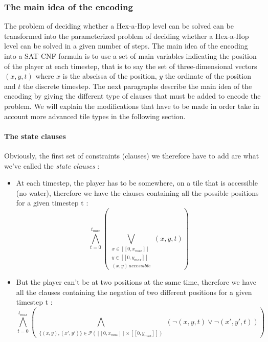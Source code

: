 \documentclass[a4paper, 12pt, titlepage]{article}
\begin{document}
\subsubsection{The main idea of the encoding}
The problem of deciding whether a Hex-a-Hop level can be solved can be
transformed into the parameterized problem of deciding whether a Hex-a-Hop level
can be solved in a given number of steps.
The main idea of the encoding into a SAT CNF formula is to use a set of main
variables indicating the position of the player at each timestep, that is to say
the set of three-dimensional vectors $(x, y, t)$ where $x$ is the abscissa of
the position, $y$ the ordinate of the position and $t$ the discrete timestep.
The next paragraphs describe the main idea of the encoding by giving the
different type of clauses that must be added to encode the problem. We will
explain the modifications that have to be made in order take in account more
advanced tile types in the following section.

\paragraph{The state clauses}
Obviously, the first set of constraints (clauses) we therefore have to add are
what we've called the {\em state clauses} :
\begin{itemize}
\item At each timestep, the player has to be somewhere, on a tile that is
      accessible (no water), therefore we have the clauses containing all the
      possible positions for a given timestep t :
      \begin{equation}
      \bigwedge \limits_{t=0}^{t_{max}}
      (\bigvee \limits_{\substack{x \in [\![0, x_{max}]\!]\\
				  y \in [\![0, y_{max}]\!]\\
				  (x, y) \, accessible}}
       (x, y, t))
      \end{equation}

\item But the player can't be at two positions at the same time, therefore we
      have all the clauses containing the negation of two different positions
      for a given timestep t :
      \begin{equation}
      \bigwedge \limits_{t=0}^{t_{max}}
      (\bigwedge \limits_{\substack{\{(x, y), (x', y')\} \in
				    \mathcal{P}({[\![0, x_{max}]\!] \times
				    [\![0, y_{max}]\!]})}}
       (\neg(x, y, t) \vee \neg(x', y', t)))
      \end{equation}
\end{itemize}
\end{document}
